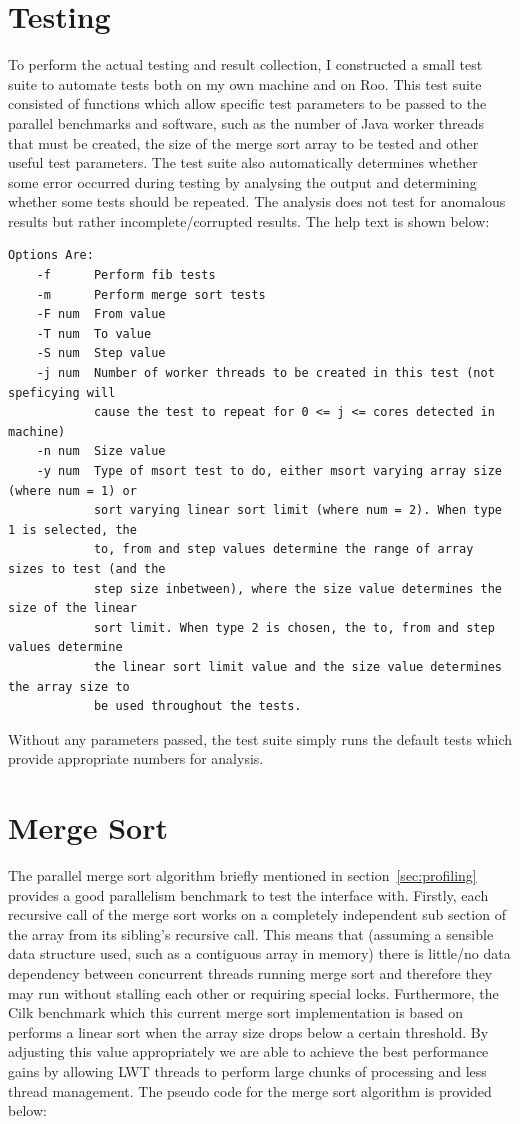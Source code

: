 \documentclass[12pt,twoside,notitlepage]{report}
\begin{document}
\section{Testing}
\label{sec:testing}
To perform the actual testing and result collection, I constructed a small test suite to automate tests both on my own machine and on Roo. This test suite consisted of functions which allow specific test parameters to be passed to the
parallel benchmarks and software, such as the number of Java worker threads that must be created, the size of the merge sort array to be tested and other useful test parameters. The test suite also automatically determines whether
some error occurred during testing by analysing the output and determining whether some tests should be repeated. The analysis does not test for anomalous results but rather incomplete/corrupted results. The help text is shown below:
\begin{lstlisting}[keywordstyle=\color{black}]
Options Are:
    -f      Perform fib tests
    -m      Perform merge sort tests
    -F num  From value
    -T num  To value
    -S num  Step value
    -j num  Number of worker threads to be created in this test (not speficying will
            cause the test to repeat for 0 <= j <= cores detected in machine)
    -n num  Size value
    -y num  Type of msort test to do, either msort varying array size (where num = 1) or
            sort varying linear sort limit (where num = 2). When type 1 is selected, the
            to, from and step values determine the range of array sizes to test (and the
            step size inbetween), where the size value determines the size of the linear
            sort limit. When type 2 is chosen, the to, from and step values determine
            the linear sort limit value and the size value determines the array size to 
            be used throughout the tests.
\end{lstlisting}
Without any parameters passed, the test suite simply runs the default tests which provide appropriate numbers for analysis.

\section{Merge Sort}
\label{sec:merge_sort}
The parallel merge sort algorithm briefly mentioned in section~\ref{sec:profiling} provides a good parallelism benchmark to test the interface with. Firstly, each recursive call of the merge sort works on a completely independent sub
section of the array from its sibling's recursive call. This means that (assuming a sensible data structure used, such as a contiguous array in memory) there is little/no data dependency between concurrent threads running merge sort
and therefore they may run without stalling each other or requiring special locks. Furthermore, the Cilk benchmark which this current merge sort implementation is based on performs a linear sort when the array size drops below a
certain threshold. By adjusting this value appropriately we are able to achieve the best performance gains by allowing LWT threads to perform large chunks of processing and less thread management. The pseudo code for the merge sort
algorithm is provided below:
\end{document}

